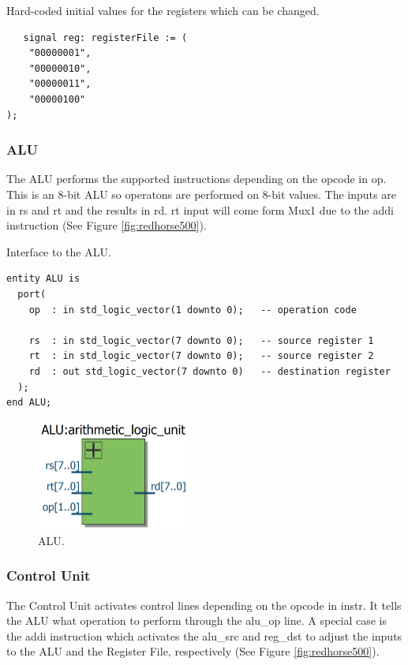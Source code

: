 \documentclass[a4paper, 11pt,oneside]{article}
\begin{document}
\begin{listing}[H]
\caption{Hard-coded initial values for the registers which can be changed.}
\label{code:rf_values}
\begin{verbatim}
   signal reg: registerFile := (
    "00000001",
    "00000010",
    "00000011",
    "00000100"
);
\end{verbatim}
\end{listing}

\subsubsection{ALU}
The ALU performs the supported instructions depending on the opcode in op. This 
is 
an 8-bit ALU so operatons are performed on 8-bit values. The inputs are in rs 
and rt and the results in rd. rt input will come form Mux1 due to the addi 
instruction (See Figure \ref{fig:redhorse500}).

\begin{listing}[H]
\caption{Interface to the ALU.}
\label{code:alu}
\begin{verbatim}
entity ALU is
  port(
    op  : in std_logic_vector(1 downto 0);   -- operation code

    rs  : in std_logic_vector(7 downto 0);   -- source register 1
    rt  : in std_logic_vector(7 downto 0);   -- source register 2
    rd  : out std_logic_vector(7 downto 0)   -- destination register
  );
end ALU;

\end{verbatim}
\end{listing}

\begin{figure}[H]
	\begin{center}
	\includegraphics[width=2in]{alu.png}
	\caption{ALU.}
	\label{fig:alu} 
	\end{center}
\end{figure}

\subsubsection{Control Unit}
The Control Unit activates control lines depending on the opcode in instr. It 
tells 
the ALU what operation to perform through the alu\_op line. A special case is 
the addi instruction which activates the alu\_src and reg\_dst to adjust the 
inputs to the ALU and the Register File, respectively (See Figure 
\ref{fig:redhorse500}). 
\end{document}
